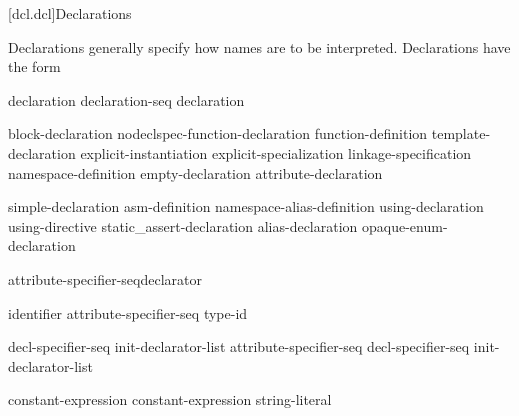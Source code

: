 [dcl.dcl]{Declarations}%



\pnum
Declarations generally specify how names are to be interpreted. Declarations have
the form

\begin{bnf}
\br
    declaration\br
    declaration-seq declaration
\end{bnf}

\begin{bnf}
\br
    block-declaration\br
    nodeclspec-function-declaration\br
    function-definition\br
    template-declaration\br
    explicit-instantiation\br
    explicit-specialization\br
    linkage-specification\br
    namespace-definition\br
    empty-declaration\br
    attribute-declaration
\end{bnf}

\begin{bnf}
\br
    simple-declaration\br
    asm-definition\br
    namespace-alias-definition\br
    using-declaration\br
    using-directive\br
    static_assert-declaration\br
    alias-declaration\br
    opaque-enum-declaration
\end{bnf}

\begin{bnf}
\br
    attribute-specifier-seq\opt declarator \terminal{;}
\end{bnf}

\begin{bnf}
\br
     identifier attribute-specifier-seq\opt \terminal{=} type-id \terminal{;}
\end{bnf}

\begin{bnf}
\br
    decl-specifier-seq init-declarator-list\opt \terminal{;}\br
    attribute-specifier-seq decl-specifier-seq init-declarator-list \terminal{;}
\end{bnf}

\begin{bnf}
\br
   \terminal{(} constant-expression \terminal{)} \terminal{;}\br
   \terminal{(} constant-expression \terminal{,} string-literal \terminal{)} \terminal{;}
\end{bnf}

